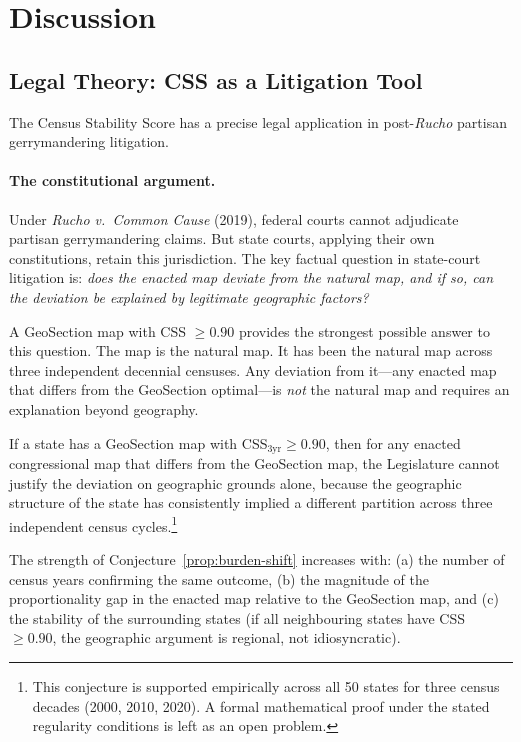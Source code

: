 \section{Discussion}
\label{sec:discussion}

\subsection{Legal Theory: CSS as a Litigation Tool}
\label{sec:legal}

The Census Stability Score has a precise legal application in
post-\emph{Rucho} partisan gerrymandering litigation.

\paragraph{The constitutional argument.}
Under \emph{Rucho v.\ Common Cause} (2019), federal courts cannot adjudicate
partisan gerrymandering claims.
But state courts, applying their own constitutions, retain this jurisdiction.
The key factual question in state-court litigation is: \emph{does the enacted
map deviate from the natural map, and if so, can the deviation be explained
by legitimate geographic factors?}

A GeoSection map with CSS $\geq 0.90$ provides the strongest possible answer
to this question.
The map is the natural map.
It has been the natural map across three independent decennial censuses.
Any deviation from it---any enacted map that differs from the GeoSection
optimal---is \emph{not} the natural map and requires an explanation beyond
geography.

\begin{conjecture}
\label{prop:burden-shift}
If a state has a GeoSection map with CSS$_{3\text{yr}} \geq 0.90$, then
for any enacted congressional map that differs from the GeoSection map,
the Legislature cannot justify the deviation on geographic grounds alone,
because the geographic structure of the state has consistently implied a
different partition across three independent census cycles.\footnote{This
conjecture is supported empirically across all 50 states for three census
decades (2000, 2010, 2020). A formal mathematical proof under the stated
regularity conditions is left as an open problem.}
\end{conjecture}

The strength of Conjecture~\ref{prop:burden-shift} increases with:
(a) the number of census years confirming the same outcome,
(b) the magnitude of the proportionality gap in the enacted map relative
to the GeoSection map, and
(c) the stability of the surrounding states (if all neighbouring states
have CSS $\geq 0.90$, the geographic argument is regional, not idiosyncratic).

